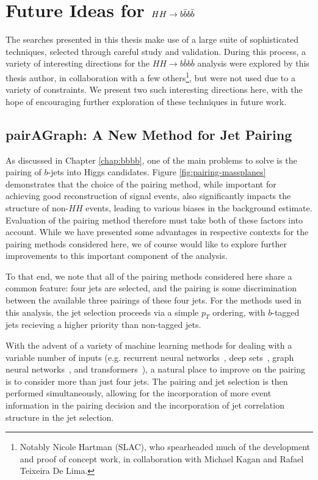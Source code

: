 \chapter{Future Ideas for $HH\rightarrow b\bar{b}b\bar{b}$}
\label{chap:future}

The searches presented in this thesis make use of a large suite of sophisticated techniques, selected 
through careful study and validation. During this process, a variety of interesting 
directions for the $HH\rightarrow b\bar{b}b\bar{b}$ analysis were explored by this thesis author, 
in collaboration with a few others\footnote{Notably Nicole Hartman (SLAC), who spearheaded much of the 
development and proof of concept work, in collaboration with Michael Kagan and Rafael Teixeira De Lima.}, 
but were not used due to a variety of constraints. We present two such interesting directions here, 
with the hope of encouraging further exploration of these techniques in future work.

\section{pairAGraph: A New Method for Jet Pairing}
As discussed in Chapter \ref{chap:bbbb}, one of the main problems to solve is the pairing of 
$b$-jets into Higgs candidates. Figure \ref{fig:pairing-massplanes} demonstrates that the choice 
of the pairing method, while important for achieving good reconstruction of signal events, also 
significantly impacts the structure of non-$HH$ events, leading to various biases in the 
background estimate. Evaluation of the pairing method therefore must take both of these factors 
into account. While we have presented some advantages in respective contexts for the pairing 
methods considered here, we of course would like to explore further improvements to this important 
component of the analysis.

To that end, we note that all of the pairing methods considered here share a common feature: 
four jets are selected, and the pairing is some discrimination between the available three pairings 
of these four jets. For the methods used in this analysis, the jet selection proceeds via a 
simple $p_{T}$ ordering, with $b$-tagged jets recieving a higher priority than non-tagged jets.

With the advent of a variety of machine learning methods for dealing with a variable number of 
inputs (e.g. recurrent neural networks~\cite{RNNs}, deep sets~\cite{DeepSets}, graph neural networks~\cite{GNNs}, 
and transformers~\cite{Transformers}), a natural place to improve on the 
pairing is to consider more than just four jets. The pairing and jet selection is then performed 
simultaneously, allowing for the incorporation of more event information in the pairing decision and 
the incorporation of jet correlation structure in the jet selection.

